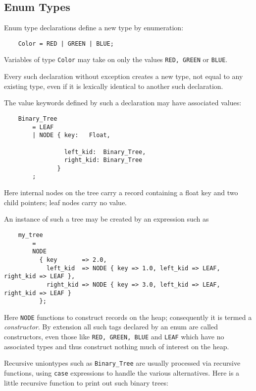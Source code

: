 \cutend*



\subsection{Enum Types}
\label{section:ref:types:enum-types}

Enum type declarations define a new type by enumeration:

\begin{verbatim}
    Color = RED | GREEN | BLUE;
\end{verbatim}

Variables of type {\tt Color} may take on only the values 
{\tt RED, GREEN} or {\tt BLUE}.

Every such declaration without exception creates a new 
type, not equal to any existing type, even if it is 
lexically identical to another such declaration.

The value keywords defined by such a declaration may have 
associated values:

\begin{verbatim}
    Binary_Tree
        = LEAF
        | NODE { key:   Float,

                 left_kid:  Binary_Tree,
                 right_kid: Binary_Tree
               }
        ;
\end{verbatim}

Here internal nodes on the tree carry a record  
containing a float key and two child pointers;  leaf nodes carry no value.

An instance of such a tree may be created by an expression such as

\begin{verbatim}
    my_tree
        =
        NODE
          { key       => 2.0,
            left_kid  => NODE { key => 1.0, left_kid => LEAF, right_kid => LEAF },
            right_kid => NODE { key => 3.0, left_kid => LEAF, right_kid => LEAF }
          };
\end{verbatim}

Here {\tt NODE} functions to construct records on the heap; 
consequently it is termed a {\it constructor}.  By extension 
all such tags declared by an enum are called constructors, 
even those like {\tt RED, GREEN, BLUE} and {\tt LEAF} which 
have no associated types and thus construct nothing much of 
interest on the heap.

Recursive uniontypes such as {\tt Binary\_Tree} are usually 
processed via recursive functions, using {\tt case} expressions 
to handle the various alternatives.  Here is a little 
recursive function to print out such binary trees: 


